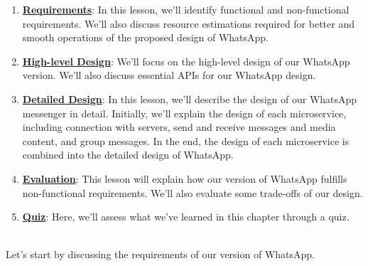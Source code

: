 \begin{enumerate}
\item
\protect{}\label{JXPETGk8rRp0vNITQombf}
\href{https://www.educative.io/courses/grokking-the-system-design-interview/requirements-of-whatsapps-design}{\textbf{Requirements}}: In this lesson, we'll identify functional and non-functional requirements. We'll also discuss resource estimations required for better and smooth operations of the proposed design of WhatsApp.
\item
\protect{}\label{fiwUVScSBvHBknFrF0n38}
\href{https://www.educative.io/courses/grokking-the-system-design-interview/high-level-design-of-whatsapp}{\textbf{High-level Design}}: We'll focus on the high-level design of our WhatsApp version. We'll also discuss essential APIs for our WhatsApp design.
\item
\protect{}\label{fOnessOrIgjHLqpVxyvci}
\href{https://www.educative.io/courses/grokking-the-system-design-interview/detailed-design-of-whatsapp}{\textbf{Detailed Design}}: In this lesson, we'll describe the design of our WhatsApp messenger in detail. Initially, we'll explain the design of each microservice, including connection with servers, send and receive messages and media content, and group messages. In the end, the design of each microservice is combined into the detailed design of WhatsApp.
\item
\protect{}\label{HU1Hje0XcnlPcm7nWD7DE}
\href{https://www.educative.io/courses/grokking-the-system-design-interview/evaluation-of-whatsapps-design}{\textbf{Evaluation}}: This lesson will explain how our version of WhatsApp fulfills non-functional requirements. We'll also evaluate some trade-offs of our design.
\item
\protect{}\label{i0qDGZKj1de4IDpE8-Brd}
\href{https://www.educative.io/courses/grokking-the-system-design-interview/quiz-on-whatsapps-design}{\textbf{Quiz}}: Here, we'll assess what we've learned in this chapter through a quiz.
\end{enumerate}
\\
Let's start by discussing the requirements of our version of WhatsApp.

